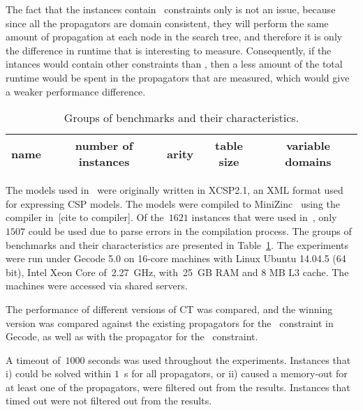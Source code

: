 \documentclass[a4paper,11pt]{article}
\newcommand{\Todo}[1]{{\color{blue}#1}}
\newcommand{\Table}{\Constraint{Table}}
\newcommand{\CTpaper}[0]{DBLP:conf/cp/DemeulenaereHLP16}
\numberwithin{equation}{section}
\begin{document}
The fact that the instances contain \Table~constraints only is not an
issue, because since all the propagators are domain consistent, they will
perform the same amount of propagation at each node in the search tree,
and therefore it is only the difference
in runtime that is interesting to measure. Consequently, if the intances would contain
other constraints than \Table, then a less amount of the total runtime would be spent
in the propagators that are measured, which would give a weaker performance difference.

\begin{table}[h]%
  \caption{Groups of benchmarks and their characteristics.}
  \label{tab:benchmarks}
  
  \begin{sideways}
    \centering
    \begin{tabular}{lcccc}  %
      name & number of instances & arity & table size & variable domains \\
      \midrule
       
    \end{tabular}
  \end{sideways}
\end{table}

\clearpage

The models used in~\cite{\CTpaper} were originally written in XCSP2.1,
an XML format used for expressing CSP models. The models were compiled
to MiniZinc~\cite{MiniZinc} using the compiler in~\Todo{[cite to compiler]}.
Of the~$1621$ instances that were used in~\cite{\CTpaper},
only~$1507$ could be used due to parse errors in the compilation process.
The groups of benchmarks and their characteristics are presented in Table~\ref{tab:benchmarks}.
The experiments were run
under Gecode 5.0 on 16-core machines with Linux Ubuntu 14.04.5 (64 bit),
Intel Xeon Core of~2.27~GHz, with~25~GB RAM and 8 MB L3 cache. The machines
were accessed via shared servers.

The performance of different versions of CT was compared, and the winning
version was compared against the existing propagators for
the \Table~constraint in Gecode, as well as with the propagator for the
~constraint.

A timeout of~$1000$ seconds was used throughout the experiments.
Instances that i) could be solved within $1$~s for all propagators, or
ii) caused a memory-out for at least one of the propagators,
were filtered out from the results.
Instances that timed out were not filtered out from the results.
\end{document}
